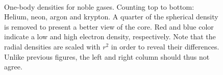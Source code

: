 \begin{figure}
\begin{center}
     \\
  \caption{One-body densities for noble gases. Counting top to bottom: Helium, neon, argon and krypton. A quarter of the spherical density is removed to present a better view of the core. Red and blue color indicate a low and high electron density, respectively. Note that the radial densities are scaled with $r^2$ in order to reveal their differences. Unlike previous figures, the left and right column should thus not agree.}
  \label{fig:OBD_noble_Atoms_2D_combo}
 \end{center}
\end{figure}
 
 
